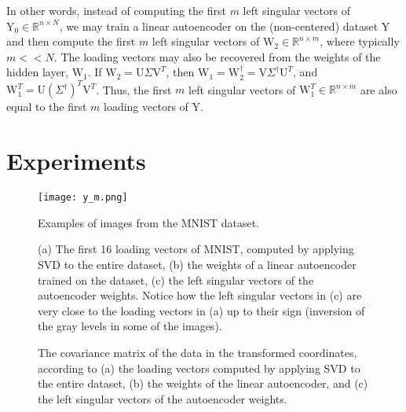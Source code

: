 \documentclass[journal]{IEEEtran}
\begin{document}
In other words, instead of computing the first $m$ left singular vectors of $\text{Y}_0 \in \mathbb{R}^{n \times N}$, we may train a linear autoencoder on the (non-centered) dataset $\text{Y}$ and then compute the first $m$ left singular vectors of $\text{W}_2 \in \mathbb{R}^{n \times m}$, where typically $m << N$. The loading vectors may also be recovered from the weights of the hidden layer, $\text{W}_1$. If $\text{W}_2 = \text{U} \Sigma \text{V}^T$, then $\text{W}_1 = \text{W}_2^{\dagger} = \text{V} \Sigma^{\dagger} \text{U}^T$, and $\text{W}_1^T = \text{U} \left( \Sigma^{\dagger} \right)^T \text{V}^T$. Thus, the first $m$ left singular vectors of $\text{W}_1^T \in \mathbb{R}^{n \times m}$ are also equal to the first $m$ loading vectors of $\text{Y}$.


\section{Experiments}
\begin{figure}[!b]
\centering
\texttt{[image: y\_m.png]}
\caption{Examples of images from the MNIST dataset.}
\label{fig0}
\end{figure}
\begin{figure*}
    \centering
    \label{1a}\hfill
    \label{1b}\hfill
    \label{1c}
  \caption{(a) The first 16 loading vectors of MNIST, computed by applying SVD to the entire dataset, (b) the weights of a linear autoencoder trained on the dataset, (c) the left singular vectors of the autoencoder weights. Notice how the left singular vectors in (c) are very close to the loading vectors in (a) up to their sign (inversion of the gray levels in some of the images).}
  \label{fig1} 
\end{figure*}

\begin{figure*} 
    \centering
    \label{1a}\hfill
    \label{1b}\hfill
    \label{1c}
  \caption{The covariance matrix of the data in the transformed coordinates, according to (a) the loading vectors computed by applying SVD to the entire dataset, (b) the weights of the linear autoencoder, and (c) the left singular vectors of the autoencoder weights.}
  \label{fig2}
\end{figure*}
\end{document}

